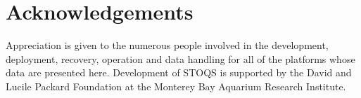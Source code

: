 \documentclass[conference]{IEEEtran}
\begin{document}
\section*{Acknowledgements}

Appreciation is given to the numerous people involved in the development, deployment, recovery, operation and data handling for all of the platforms whose data are presented here. Development of STOQS is supported by the David and Lucile Packard Foundation at the Monterey Bay Aquarium Research Institute.








%




\end{document}
